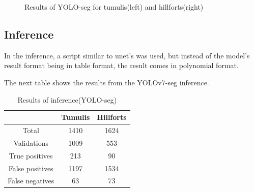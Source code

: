 \begin{figure}[H]
    \centering
    \qquad
    \caption{Results of YOLO-seg for tumulis(left) and hillforts(right)}%
\end{figure}

\subsection{Inference}
In the inference, a script similar to unet's was used, but instead of the model's result format being in table format, the result comes in polynomial format.

The next table shows the results from the YOLOv7-seg inference.

\begin{table}[H]
\centering
\begin{tabular}{|c c c|} 
 \hline
  &  Tumulis & Hillforts \\ [0.5ex] 
 \hline\hline
 Total & 1410 & 1624 \\ 
 Validations & 1009 & 553 \\
 True positives & 213 & 90 \\
 False positives & 1197 & 1534 \\
 False negatives & 63 & 73\\ [1ex] 
 \hline
\end{tabular}
\caption{Results of inference(YOLO-seg)}
\end{table}